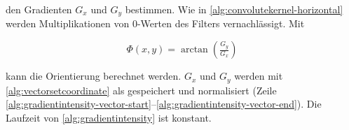 den Gradienten $G_x$ und $G_y$ bestimmen. Wie in \autoref{alg:convolutekernel-horizontal} werden Multiplikationen von
 $0$-Werten des Filters vernachlässigt. Mit

\begin{equation}
	\label{eq:orientation}
	\Phi(x,y) = \arctan{\left(\tfrac{G_y}{G_x}\right)}
\end{equation}

kann die Orientierung berechnet werden. $G_x$ und $G_y$ werden mit \autoref{alg:vectorsetcoordinate} als
  gespeichert und normalisiert
 (Zeile \ref{alg:gradientintensity-vector-start}--\ref{alg:gradientintensity-vector-end}). Die Laufzeit von
 \autoref{alg:gradientintensity} ist konstant.


